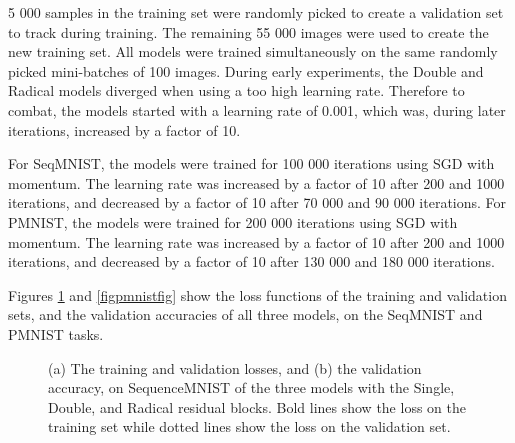 \documentclass[a4paper, twoside]{article}
\begin{document}
5 000 samples in the training set were randomly picked to create a validation set to track during training. The remaining 55 000 images were used to create the new training set. All models were trained simultaneously on the same randomly picked mini-batches of 100 images. During early experiments, the Double and Radical models diverged when using a too high learning rate. Therefore to combat, the models started with a learning rate of 0.001, which was, during later iterations, increased by a factor of 10.

For SeqMNIST, the models were trained for 100 000 iterations using SGD with momentum. The learning rate was increased by a factor of 10 after 200 and 1000 iterations, and decreased by a factor of 10 after 70 000 and 90 000 iterations. For PMNIST, the models were trained for 200 000 iterations using SGD with momentum. The learning rate was increased by a factor of 10 after 200 and 1000 iterations, and decreased by a factor of 10 after 130 000 and 180 000 iterations.

Figures \ref{figseqmnistfig} and \ref{figpmnistfig} show the loss functions of the training and validation sets, and the validation accuracies of all three models, on the SeqMNIST and PMNIST tasks.

\begin{figure}[h]
    \centering
  	\caption{(a) The training and validation losses, and (b) the validation accuracy, on SequenceMNIST of the three models with the Single, Double, and Radical residual blocks. Bold lines show the loss on the training set while dotted lines show the loss on the validation set.} \label{figseqmnistfig}
\end{figure}
\end{document}
